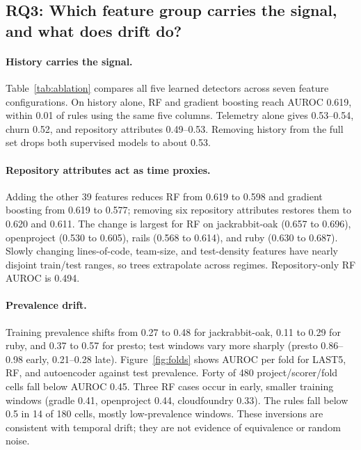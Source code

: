 \documentclass[sigconf,review,anonymous,nonacm]{acmart}
\begin{document}
\subsection{RQ3: Which feature group carries the signal, and what does drift do?}
\label{sec:results-rq3}




\paragraph{History carries the signal.} Table~\ref{tab:ablation} compares all five learned detectors across seven feature configurations. On history alone, RF and gradient boosting reach AUROC 0.619, within 0.01 of rules using the same five columns. Telemetry alone gives 0.53--0.54, churn 0.52, and repository attributes 0.49--0.53. Removing history from the full set drops both supervised models to about 0.53.

\paragraph{Repository attributes act as time proxies.} Adding the other 39 features reduces RF from 0.619 to 0.598 and gradient boosting from 0.619 to 0.577; removing six repository attributes restores them to 0.620 and 0.611. The change is largest for RF on jackrabbit-oak (0.657 to 0.696), openproject (0.530 to 0.605), rails (0.568 to 0.614), and ruby (0.630 to 0.687). Slowly changing lines-of-code, team-size, and test-density features have nearly disjoint train/test ranges, so trees extrapolate across regimes. Repository-only RF AUROC is 0.494.

\paragraph{Prevalence drift.} Training prevalence shifts from 0.27 to 0.48 for jackrabbit-oak, 0.11 to 0.29 for ruby, and 0.37 to 0.57 for presto; test windows vary more sharply (presto 0.86--0.98 early, 0.21--0.28 late). Figure~\ref{fig:folds} shows AUROC per fold for LAST5, RF, and autoencoder against test prevalence. Forty of 480 project/scorer/fold cells fall below AUROC 0.45. Three RF cases occur in early, smaller training windows (gradle 0.41, openproject 0.44, cloudfoundry 0.33). The rules fall below 0.5 in 14 of 180 cells, mostly low-prevalence windows. These inversions are consistent with temporal drift; they are not evidence of equivalence or random noise.
\end{document}
